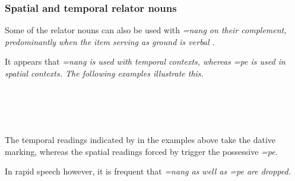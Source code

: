 \subsubsection{Spatial and temporal relator nouns}\label{sec:wc:Spatialandtemporalrelatornouns}


Some of the relator nouns can also be used with \em =nang \em on their complement, predominantly when the item serving as ground is verbal \citep{SmithEtAl2004}.

It appears that \em =nang \em is used with temporal contexts, whereas \em =pe \em is used in spatial contexts. The following examples illustrate this.


 \\

 \\
 \\

 \\
The temporal readings indicated by  in the examples above take the dative marking, whereas the spatial readings forced by  trigger the possessive \em =pe\em.

In rapid speech however, it is frequent that \em =nang \em as well as \em =pe \em are dropped.




%
%
%
%
%
%


